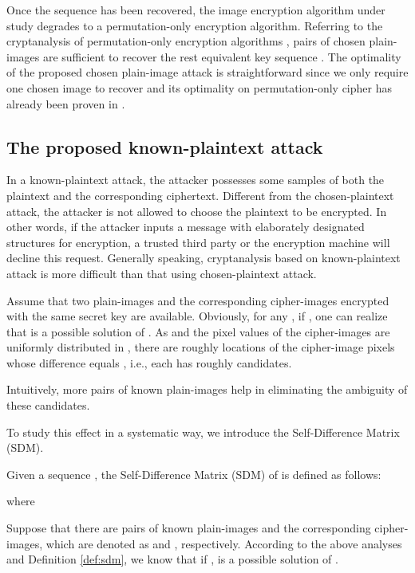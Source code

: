 \documentclass[smallextended, final]{svjour3}          \smartqed
\begin{document}
Once the sequence  has been recovered, the image encryption algorithm under study degrades to a
permutation-only encryption algorithm. Referring to the cryptanalysis
of permutation-only encryption algorithms \cite{li2008general, li2011optimal},
 pairs of chosen plain-images are sufficient to recover the rest equivalent key sequence .
The optimality of the proposed chosen plain-image attack is straightforward since we only require one chosen image to recover 
and its optimality on permutation-only cipher has already been proven in \cite{li2011optimal}.

\subsection{The proposed known-plaintext attack}
\label{subsec:kpa}
In a known-plaintext attack, the attacker possesses some samples of both the plaintext and the corresponding ciphertext.
Different from the chosen-plaintext attack, the attacker is not allowed to choose the plaintext to be encrypted.
In other words, if the attacker inputs a message with elaborately designated structures for encryption, a trusted third party or the encryption machine will decline this request.
Generally speaking, cryptanalysis based on known-plaintext attack is more difficult than that using chosen-plaintext attack.

Assume that two plain-images 
and the corresponding cipher-images 
encrypted with the same secret key are available.
Obviously, for any , if ,
one can realize that  is a possible solution of .
As  {and the pixel values of the cipher-images are uniformly distributed in ,
there are roughly  locations of the cipher-image pixels whose difference  equals },
i.e., each  has roughly  candidates.

Intuitively, more pairs of known plain-images help in eliminating {the} ambiguity of these candidates.
{To study this effect in a systematic way, we introduce the Self-Difference Matrix (SDM).
\begin{definition}
\label{def:sdm}
Given a sequence ,
the Self-Difference Matrix (SDM) of  is defined as follows:

where

\end{definition}}

Suppose that there are  pairs of known plain-images and the corresponding cipher-images,
which are denoted as  and ,
respectively. According to the above analyses and Definition \ref{def:sdm},
we know that if ,
 is a possible solution of .
\end{document}

